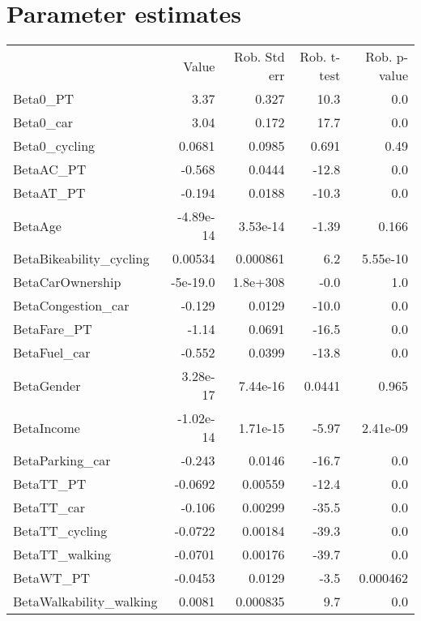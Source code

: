 \section{Parameter estimates}
\begin{tabular}{lrrrr}
 & Value & Rob. Std err & Rob. t-test & Rob. p-value \\
Beta0_PT & 3.37 & 0.327 & 10.3 & 0.0 \\
Beta0_car & 3.04 & 0.172 & 17.7 & 0.0 \\
Beta0_cycling & 0.0681 & 0.0985 & 0.691 & 0.49 \\
BetaAC_PT & -0.568 & 0.0444 & -12.8 & 0.0 \\
BetaAT_PT & -0.194 & 0.0188 & -10.3 & 0.0 \\
BetaAge & -4.89e-14 & 3.53e-14 & -1.39 & 0.166 \\
BetaBikeability_cycling & 0.00534 & 0.000861 & 6.2 & 5.55e-10 \\
BetaCarOwnership & -5e-19.0 & 1.8e+308 & -0.0 & 1.0 \\
BetaCongestion_car & -0.129 & 0.0129 & -10.0 & 0.0 \\
BetaFare_PT & -1.14 & 0.0691 & -16.5 & 0.0 \\
BetaFuel_car & -0.552 & 0.0399 & -13.8 & 0.0 \\
BetaGender & 3.28e-17 & 7.44e-16 & 0.0441 & 0.965 \\
BetaIncome & -1.02e-14 & 1.71e-15 & -5.97 & 2.41e-09 \\
BetaParking_car & -0.243 & 0.0146 & -16.7 & 0.0 \\
BetaTT_PT & -0.0692 & 0.00559 & -12.4 & 0.0 \\
BetaTT_car & -0.106 & 0.00299 & -35.5 & 0.0 \\
BetaTT_cycling & -0.0722 & 0.00184 & -39.3 & 0.0 \\
BetaTT_walking & -0.0701 & 0.00176 & -39.7 & 0.0 \\
BetaWT_PT & -0.0453 & 0.0129 & -3.5 & 0.000462 \\
BetaWalkability_walking & 0.0081 & 0.000835 & 9.7 & 0.0 \\
\end{tabular}


